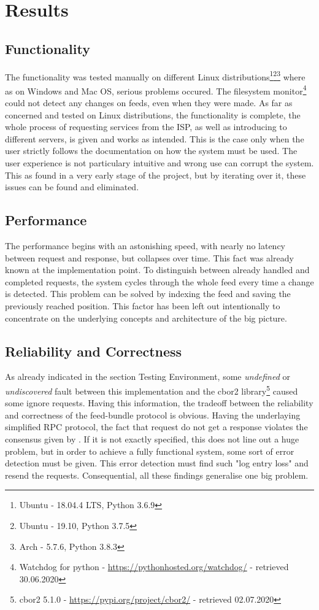 \section{Results}
\subsection{Functionality}
The functionality was tested manually on different Linux distributions\footnote{Ubuntu - 18.04.4 LTS, Python 3.6.9}\footnote{Ubuntu - 19.10, Python 3.7.5}\footnote{Arch - 5.7.6, Python 3.8.3} where as on Windows and Mac OS, serious problems occured. The filesystem monitor\footnote{Watchdog for python - \url{https://pythonhosted.org/watchdog/} - retrieved 30.06.2020} could not detect any changes on feeds, even when they were made. As far as concerned and tested on Linux distributions, the functionality is complete, the whole process of requesting services from the ISP, as well as introducing to different servers, is given and works as intended. This is the case only when the user strictly follows the documentation on how the system must be used. The user experience is not particulary intuitive and wrong use can corrupt the system. This as found in a very early stage of the project, but by iterating over it, these issues can be found and eliminated.
\subsection{Performance}
The performance begins with an astonishing speed, with nearly no latency between request and response, but collapses over time. This fact was already known at the implementation point. To distinguish between already handled and completed requests, the system cycles through the whole feed every time a change is detected. This problem can be solved by indexing the feed and saving the previously reached position. This factor has been left out intentionally to concentrate on the underlying concepts and architecture of the big 
picture.
\subsection{Reliability and Correctness}
As already indicated in the section Testing Environment, some \textit{undefined} or \textit{undiscovered} fault between this implementation and the cbor2 library\footnote{cbor2 5.1.0 - \url{https://pypi.org/project/cbor2/} - retrieved 02.07.2020} caused some ignore requests. Having this information, the tradeoff between the reliability and correctness of the feed-bundle protocol is obvious. Having the underlaying simplified RPC protocol, the fact that request do not get a response violates the consensus given by \citet{birrell1984implementing}. If it is not exactly specified, this does not line out a huge problem, but in order to achieve a fully functional system, some sort of error detection must be given. This error detection must find such "log entry loss" and resend the requests. Consequential, all these findings generalise one big problem.

